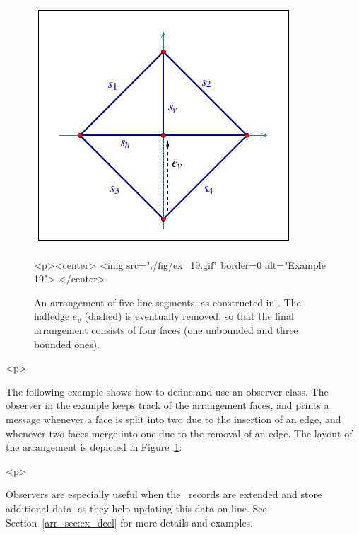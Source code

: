 \begin{figure}[!htp]
\begin{ccTexOnly}
  \begin{center}
  \includegraphics{Arrangement_2/fig/ex_19}
  \end{center}
\end{ccTexOnly}
\begin{ccHtmlOnly}
  <p><center>
  <img src="./fig/ex_19.gif" border=0 alt="Example 19">
  </center>
\end{ccHtmlOnly}
\caption{An arrangement of five line segments, as constructed in
. The halfedge $e_v$ (dashed) is eventually
removed, so that the final arrangement consists of four faces (one
unbounded and three bounded ones).}
\label{arr_fig:ex_19}
\end{figure}

\begin{ccHtmlOnly}<p>\end{ccHtmlOnly}
The following example shows how to define and use an observer
class. The observer in the example keeps track of the arrangement
faces, and prints a message whenever a face is split into two due
to the insertion of an edge, and whenever two faces merge into one
due to the removal of an edge. The layout of the arrangement is
depicted in Figure~\ref{arr_fig:ex_19}:


\begin{ccHtmlOnly}<p>\end{ccHtmlOnly}
Observers are especially useful when the \dcel\ records are
extended and store additional data, as they help updating this
data on-line. See Section~\ref{arr_sec:ex_dcel} for more details
and examples.

